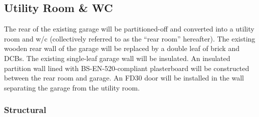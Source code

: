\documentclass{extension}
\begin{document}
\subsection{Utility Room \& WC}
\label{utility}
The rear of the existing garage will be partitioned-off and converted into a utility room and w/c (collectively referred to as the ``rear room'' hereafter). The existing wooden rear wall of the garage will be replaced by a double leaf of brick and DCBs. The existing single-leaf garage wall will be insulated. An insulated partition wall lined with BS-EN-520-compliant plasterboard\cite{upboard} will be constructed between the rear room and garage. An FD30 door will be installed in the wall separating the garage from the utility room.
\subsubsection{Structural}
\end{document}
